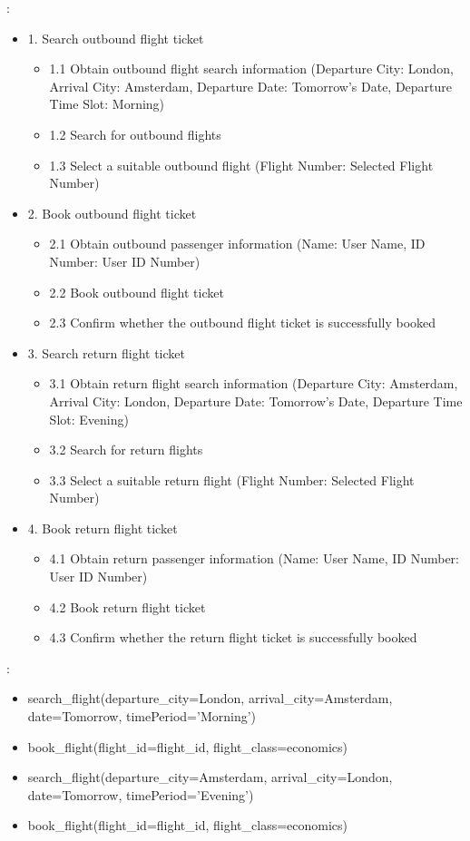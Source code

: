 :
\begin{itemize}
    \item 1. Search outbound flight ticket
    \begin{itemize}
        \item 1.1 Obtain outbound flight search information (Departure City: London, Arrival City: Amsterdam, Departure Date: Tomorrow's Date, Departure Time Slot: Morning)
        \item 1.2 Search for outbound flights
        \item 1.3 Select a suitable outbound flight (Flight Number: Selected Flight Number)
    \end{itemize}
    \item 2. Book outbound flight ticket
    \begin{itemize}
        \item 2.1 Obtain outbound passenger information (Name: User Name, ID Number: User ID Number)
        \item 2.2 Book outbound flight ticket
        \item 2.3 Confirm whether the outbound flight ticket is successfully booked
    \end{itemize}
    \item 3. Search return flight ticket
    \begin{itemize}
        \item 3.1 Obtain return flight search information (Departure City: Amsterdam, Arrival City: London, Departure Date: Tomorrow's Date, Departure Time Slot: Evening)
        \item 3.2 Search for return flights
        \item 3.3 Select a suitable return flight (Flight Number: Selected Flight Number)
    \end{itemize}
    \item 4. Book return flight ticket
    \begin{itemize}
        \item 4.1 Obtain return passenger information (Name: User Name, ID Number: User ID Number)
        \item 4.2 Book return flight ticket
        \item 4.3 Confirm whether the return flight ticket is successfully booked
    \end{itemize}
\end{itemize}

:
\begin{itemize}
    \item search\_flight(departure\_city=London, arrival\_city=Amsterdam, date=Tomorrow, timePeriod='Morning')
    \item book\_flight(flight\_id=flight\_id, flight\_class=economics)
    \item search\_flight(departure\_city=Amsterdam, arrival\_city=London, date=Tomorrow, timePeriod='Evening')
    \item book\_flight(flight\_id=flight\_id, flight\_class=economics)
\end{itemize}

